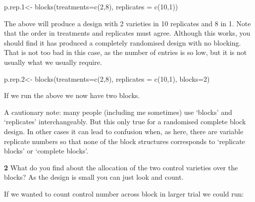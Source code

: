 \documentclass[
]{book}
\makeatletter
\newenvironment{Shaded}{\begin{snugshade}}{\end{snugshade}}
\newcommand{\AttributeTok}[1]{\textcolor[rgb]{0.77,0.63,0.00}{#1}}
\newcommand{\DecValTok}[1]{\textcolor[rgb]{0.00,0.00,0.81}{#1}}
\newcommand{\FloatTok}[1]{\textcolor[rgb]{0.00,0.00,0.81}{#1}}
\newcommand{\FunctionTok}[1]{\textcolor[rgb]{0.00,0.00,0.00}{#1}}
\newcommand{\NormalTok}[1]{#1}
\newcommand{\OtherTok}[1]{\textcolor[rgb]{0.56,0.35,0.01}{#1}}
\newenvironment{kframe}{%
\medskip{}
\setlength{\fboxsep}{.8em}
 \def\at@end@of@kframe{}%
 \ifinner\ifhmode%
  \def\at@end@of@kframe{\end{minipage}}%
  \begin{minipage}{\columnwidth}%
 \fi\fi%
 \def\FrameCommand##1{\hskip\@totalleftmargin \hskip-\fboxsep
 \colorbox{shadecolor}{##1}\hskip-\fboxsep
     \hskip-\linewidth \hskip-\@totalleftmargin \hskip\columnwidth}%
 \MakeFramed {\advance\hsize-\width
   \@totalleftmargin\z@ \linewidth\hsize
   \@setminipage}}%
 {\par\unskip\endMakeFramed%
 \at@end@of@kframe}
\newenvironment{rmdblock}[1]
  {
  \begin{itemize}
  \renewcommand{\labelitemi}{
    \raisebox{-.7\height}[0pt][0pt]{
      {\setkeys{Gin}{width=3em,keepaspectratio}\texttt{[image: images/\#1]}}
    }
  }
  \setlength{\fboxsep}{1em}
  \begin{kframe}
  \item
  }
  {
  \end{kframe}
  \end{itemize}
  }
\newenvironment{rmdquiz}
  {\begin{rmdblock}{quiz}}
  {\end{rmdblock}}
\newenvironment{rmdcaution}
  {\begin{rmdblock}{caution}}
  {\end{rmdblock}}
\makeatother
\begin{document}
\begin{Shaded}
\begin{Highlighting}[]
\NormalTok{p.rep}\FloatTok{.1}\OtherTok{\textless{}{-}} \FunctionTok{blocks}\NormalTok{(}\AttributeTok{treatments=}\FunctionTok{c}\NormalTok{(}\DecValTok{2}\NormalTok{,}\DecValTok{8}\NormalTok{), }\AttributeTok{replicates =} \FunctionTok{c}\NormalTok{(}\DecValTok{10}\NormalTok{,}\DecValTok{1}\NormalTok{))}
\end{Highlighting}
\end{Shaded}

The above will produce a design with 2 varieties in 10 replicates and 8 in 1. Note that the order in treatments and replicates must agree. Although this works, you should find it has produced a completely randomised design with no blocking. That is not too bad in this case, as the number of entries is so low, but it is not usually what we usually require.

\begin{Shaded}
\begin{Highlighting}[]
\NormalTok{p.rep}\FloatTok{.2}\OtherTok{\textless{}{-}} \FunctionTok{blocks}\NormalTok{(}\AttributeTok{treatments=}\FunctionTok{c}\NormalTok{(}\DecValTok{2}\NormalTok{,}\DecValTok{8}\NormalTok{), }\AttributeTok{replicates =} \FunctionTok{c}\NormalTok{(}\DecValTok{10}\NormalTok{,}\DecValTok{1}\NormalTok{), }\AttributeTok{blocks=}\DecValTok{2}\NormalTok{)}
\end{Highlighting}
\end{Shaded}

If we run the above we now have two blocks.

\begin{rmdcaution}
A cautionary note: many people (including me sometimes) use `blocks' and `replicates' interchangeably. But this only true for a randomised complete block design. In other cases it can lead to confusion when, as here, there are variable replicate numbers so that none of the block structures corresponds to `replicate blocks' or `complete blocks'.
\end{rmdcaution}

\begin{rmdquiz}
\textbf{2} What do you find about the allocation of the two control varieties over the blocks? As the design is small you can just look and count.
\end{rmdquiz}

If we wanted to count control number across block in larger trial we could run:
\end{document}
